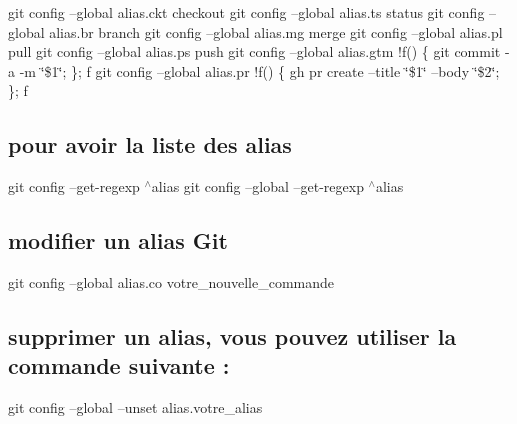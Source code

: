 git config --global alias.\+ckt checkout git config --global alias.\+ts status git config --global alias.\+br branch git config --global alias.\+mg merge git config --global alias.\+pl pull git config --global alias.\+ps push git config --global alias.\+gtm !f() \{ git commit -\/a -\/m \char`\"{}\$1\char`\"{}; \}; f git config --global alias.\+pr !f() \{ gh pr create --title \char`\"{}\$1\char`\"{} --body \char`\"{}\$2\char`\"{}; \}; f

\subsection*{pour avoir la liste des alias}

git config --get-\/regexp $^\wedge$alias git config --global --get-\/regexp $^\wedge$alias

\subsection*{modifier un alias Git}

git config --global alias.\+co votre\+\_\+nouvelle\+\_\+commande

\subsection*{supprimer un alias, vous pouvez utiliser la commande suivante \+:}

git config --global --unset alias.\+votre\+\_\+alias 